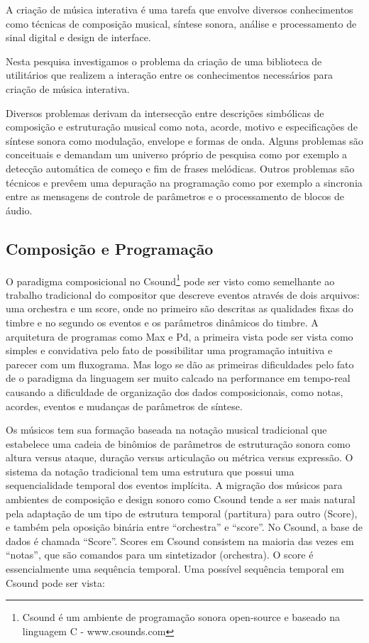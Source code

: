 \documentclass[draft]{ppgmus}
\begin{document}
A criação de música interativa é uma tarefa que envolve diversos 
conhecimentos como técnicas de composição musical, síntese sonora,
análise e processamento de sinal digital e design de interface.

Nesta pesquisa investigamos o problema da criação de uma biblioteca
de utilitários que realizem a interação entre os conhecimentos necessários
para criação de música interativa.


Diversos problemas derivam da intersecção entre descrições simbólicas
de composição e estruturação musical como nota, acorde, motivo e 
especificações de síntese sonora como modulação, envelope e formas de onda.
Alguns problemas são conceituais e demandam um universo próprio de 
pesquisa como por exemplo a detecção automática de começo e fim de
frases melódicas. Outros problemas são técnicos e prevêem uma depuração
na programação como por exemplo a sincronia entre as mensagens de controle de parâmetros
e o processamento de blocos de áudio. 



\subsection{Composição e Programação}
  
O paradigma composicional no Csound\footnote{Csound é um ambiente de programação
sonora open-source e baseado na linguagem C - www.csounds.com} pode ser visto como semelhante ao
trabalho tradicional do compositor que descreve eventos através de
dois arquivos: uma orchestra e um score, onde no primeiro são
descritas as qualidades fixas do timbre e no segundo os eventos e os
parâmetros dinâmicos do timbre. A arquitetura de programas como Max e
Pd, a primeira vista pode ser vista como simples e convidativa pelo
fato de possibilitar uma programação intuitiva e parecer com um
fluxograma. Mas logo se dão as primeiras dificuldades pelo fato de o
paradigma da linguagem ser muito calcado na performance em tempo-real
causando a dificuldade de organização dos dados composicionais, como
notas, acordes, eventos e mudanças de parâmetros de síntese.

Os músicos tem sua formação baseada na notação musical tradicional que
estabelece uma cadeia de binômios de parâmetros de estruturação sonora
\cite{zampronha00:notacao} como altura versus ataque, duração versus
articulação ou métrica versus expressão. O sistema da notação
tradicional tem uma estrutura que possui uma sequencialidade temporal
dos eventos implícita. A migração dos músicos para ambientes de
composição e design sonoro como Csound \cite{boulanger00:csound} tende
a ser mais natural pela adaptação de um tipo de estrutura temporal
(partitura) para outro (Score), e também pela oposição binária entre
``orchestra'' e ``score''. No Csound, a base de dados é chamada
``Score''. Scores em Csound consistem na maioria das vezes em
``notas'', que são comandos para um sintetizador (orchestra). O score
é essencialmente uma sequência temporal. Uma possível sequência
temporal em Csound pode ser vista:
\end{document}
